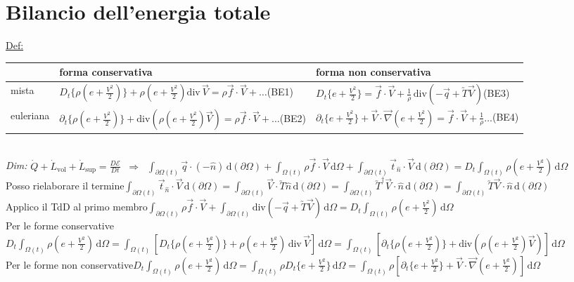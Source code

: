 \documentclass[11pt,a4paper]{report}
\newcommand{\de}{\mathrm d}
\begin{document}
	\section{Bilancio dell'energia totale}	\label{be}
	\underline{Def:} \begin{tabularx}{\linewidth}{|l|X|X|}
	\hline
    &forma conservativa&forma non conservativa\\
    \hline
	mista&$D_t\{\rho(e+\frac{V^2}{2})\}+\rho(e+\frac{V^2}{2})\mathrm{div}\,\vec V=\rho\vec f\cdot\vec V+\ldots$\quad\;\scriptsize{(BE1)}&$D_t\{e+\frac{V^2}{2}\}=\vec f\cdot\vec V+\frac 1\rho\,\mathrm{div}(-\vec q+\utilde T\vec V)$\quad\;\scriptsize{(BE3)}\\
	euleriana&$\partial_t\{\rho(e+\frac{V^2}{2})\}+\mathrm{div}(\rho(e+\frac{V^2}{2})\vec V)\!=\!\rho\vec f\cdot\vec V+\ldots$\quad\;\scriptsize{(BE2)}&$\partial_t\{e+\frac{V^2}{2}\}+\vec V\cdot\vec\nabla(e+\frac{V^2}{2})=\vec f\!\cdot\!\vec V+\frac 1\rho\ldots$\quad\;\scriptsize{(BE4)}\\
	\hline
	\end{tabularx}\\
	\textit{Dim:} $\dot Q+\dot L_\mathrm{vol}+\dot L_\mathrm{sup}=\frac{D\mathcal{E}}{Dt}\;\;\Rightarrow\;\;
	\int_{\partial\Omega(t)}\vec q\cdot(-\hat n)\,\de (\partial\Omega)+
	\int_{\Omega(t)}\rho\vec f\cdot\vec V\,\de \Omega+
	\int_{\partial\Omega(t)}\vec t_{\hat n}\cdot\vec V\,\de (\partial\Omega)=
	D_t\int_{\Omega(t)}\rho(e+\frac{V^2}{2})\,\de \Omega$	\\
	Posso rielaborare il termine\quad$\int_{\partial\Omega(t)}\vec t_{\hat n}\cdot\vec V\,\de (\partial\Omega)=\int_{\partial\Omega(t)}\vec V\cdot\utilde T\hat n\,\de (\partial\Omega)=\int_{\partial\Omega(t)}\utilde T^\dagger\vec V\cdot\hat n\,\mathrm  d(\partial\Omega)=\int_{\partial\Omega(t)}\utilde T\vec V\cdot\hat n\,\mathrm  d(\partial\Omega)$\\
	Applico il TdD al primo membro\quad$\int_{\partial\Omega(t)}\rho\vec f\cdot\vec V+\int_{\partial\Omega(t)}\mathrm{div}(-\vec q+\utilde T\vec V)\,\de \Omega=D_t\int_{\Omega(t)}\rho(e+\frac{V^2}{2})\,\de \Omega$\\
	Per le forme conservative\quad$D_t\int_{\Omega(t)}\rho(e+\frac{V^2}{2})\,\de \Omega=
	\int_{\Omega(t)}[D_t\{\rho(e+\frac{V^2}{2})\}+\rho(e+\frac{V^2}{2})\,\mathrm{div}\,\vec V]\,\de \Omega
 	=\int_{\Omega(t)}[\partial_t\{\rho(e+\frac{V^2}{2})\}+\mathrm{div}(\rho(e+\frac{V^2}{2})\vec V)]\,\de \Omega$\\
 	Per le forme non conservative\quad$D_t\int_{\Omega(t)}\rho(e+\frac{V^2}{2})\,\de \Omega=
 	\int_{\Omega(t)}\rho D_t\{e+\frac{V^2}{2}\}\,\de \Omega
 	=\int_{\Omega(t)}\rho[\partial_t\{e+\frac{V^2}{2}\}+\vec V\cdot\vec\nabla(e+\frac{V^2}{2})]\,\de \Omega$
	
\end{document}
